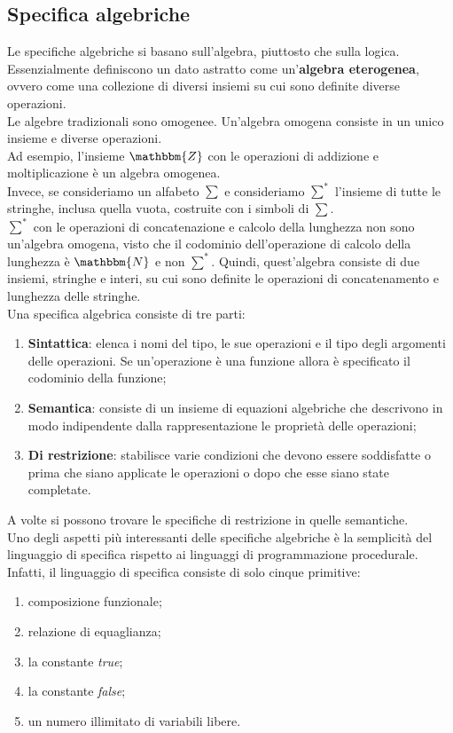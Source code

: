 \documentclass[12pt]{report}
\begin{document}
 	\subsection{Specifica algebriche}
 	Le specifiche algebriche si basano sull'algebra, piuttosto che sulla logica. Essenzialmente definiscono un dato astratto come un'\textbf{algebra eterogenea}, ovvero come una collezione di diversi insiemi su cui sono definite diverse operazioni. \\
 	Le algebre tradizionali sono omogenee. Un'algebra omogena consiste in un unico insieme e diverse operazioni. \\
 	Ad esempio, l'insieme $\mathbbm{Z}$ con le operazioni di addizione e moltiplicazione è un algebra omogenea. \\
 	Invece, se consideriamo un alfabeto $\sum$ e consideriamo $\sum^*$ l'insieme di tutte le stringhe, inclusa quella vuota, costruite con i simboli di $\sum$.  \\
 	$\sum^{*}$ con le operazioni di concatenazione e calcolo della lunghezza non sono un'algebra omogena, visto che il codominio dell'operazione di calcolo della lunghezza è $\mathbbm{N}$ e non $\sum^{*}$. Quindi, quest'algebra consiste di due insiemi, stringhe e interi, su cui sono definite le operazioni di concatenamento e lunghezza delle stringhe. \\
 	Una specifica algebrica consiste di tre parti:
 	\begin{enumerate}
 		\item \textbf{Sintattica}: elenca i nomi del tipo, le sue operazioni e il tipo degli argomenti delle operazioni. Se un'operazione è una funzione allora è specificato il codominio della funzione;
 		\item \textbf{Semantica}: consiste di un insieme di equazioni algebriche che descrivono in modo indipendente dalla rappresentazione le proprietà delle operazioni;
 		\item \textbf{Di restrizione}: stabilisce varie condizioni che devono essere soddisfatte o prima che siano applicate le operazioni o dopo che esse siano state completate.
 	\end{enumerate}
 	A volte si possono trovare le specifiche di restrizione in quelle semantiche.  \\
 	Uno degli aspetti più interessanti delle specifiche algebriche è la semplicità del linguaggio di specifica rispetto ai linguaggi di programmazione procedurale. Infatti, il linguaggio di specifica consiste di solo cinque primitive:
 	\begin{enumerate}
 		\item composizione funzionale;
 		\item relazione di equaglianza;
 		\item la constante \textit{true};
 		\item la constante \textit{false};
 		\item un numero illimitato di variabili libere.
 	\end{enumerate}
\end{document}
